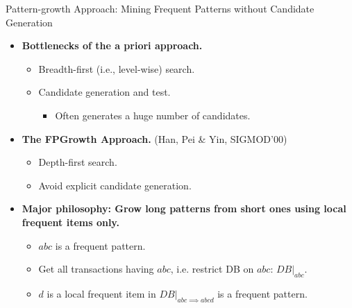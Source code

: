 \begin{frame}{Pattern-growth Approach: Mining Frequent Patterns without 
Candidate Generation}
	\begin{itemize}
		\item \textbf{Bottlenecks of the a priori approach.}
		\begin{itemize}
			\item Breadth-first (i.e., level-wise) search.
			\item Candidate generation and test.
			\begin{itemize}
				\item Often generates a huge number of candidates.
			\end{itemize}
		\end{itemize}
		\item \textbf{The FPGrowth Approach.} (Han, Pei \& Yin, SIGMOD'00)
		\begin{itemize}
			\item Depth-first search.
			\item Avoid explicit candidate generation.
		\end{itemize}
		\item \textbf{Major philosophy: Grow long patterns from short ones 
		using local frequent items only.}
		\begin{itemize}
			\item $abc$ is a frequent pattern.
			\item Get all transactions having $abc$, i.e. restrict DB on $abc$: 
			$DB|_{abc}$.
			\item $d$ is a local frequent item in $DB|_{abc \implies abcd}$ is 
			a frequent pattern.
		\end{itemize}
	\end{itemize}
\end{frame}

